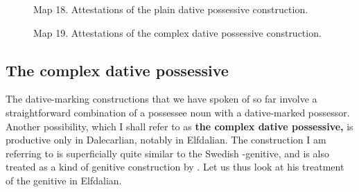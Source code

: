 
\begin{figure}[h]

\begin{minipage}{4.23958in}

\label{bkm:Ref154557005}Map 18. Attestations of the plain dative possessive construction.


\end{minipage}

\end{figure}



\begin{figure}[h]

\begin{minipage}{3.9625in}

Map 19. Attestations of the complex dative possessive construction.


\end{minipage}

\end{figure}

\subsection{The complex dative possessive}
\label{bkm:Ref224373337}
The dative-marking constructions that we have spoken of so far involve a straightforward combination of a possessee noun with a dative-marked possessor. Another possibility, which I shall refer to as \textbf{the complex dative possessive,} is productive only in Dalecarlian, notably in Elfdalian. The construction I am referring to is superficially quite similar to the Swedish -genitive, and is also treated as a kind of genitive construction by \citet{Levander1909}. Let us thus look at his treatment of the genitive in Elfdalian.


